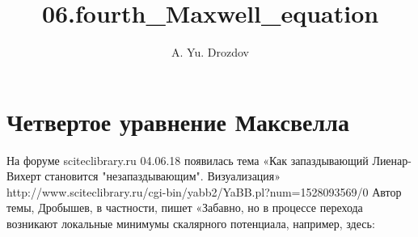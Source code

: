 \documentclass[11pt]{article}
\author{A. Yu. Drozdov}
\title{06.fourth\_Maxwell\_equation}
\begin{document}
    \maketitle

    \section{Четвертое уравнение
Максвелла}\label{ux447ux435ux442ux432ux435ux440ux442ux43eux435-ux443ux440ux430ux432ux43dux435ux43dux438ux435-ux43cux430ux43aux441ux432ux435ux43bux43bux430}

На форуме sciteclibrary.ru 04.06.18 появилась тема «Как запаздывающий
Лиенар-Вихерт становится "незапаздывающим". Визуализация»
http://www.sciteclibrary.ru/cgi-bin/yabb2/YaBB.pl?num=1528093569/0 Автор
темы, Дробышев, в частности, пишет «Забавно, но в процессе перехода
возникают локальные минимумы скалярного потенциала, например, здесь:
\end{document}
